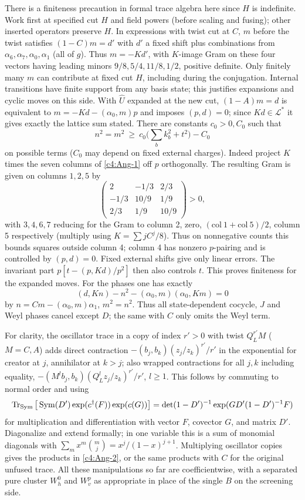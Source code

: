 There is a finiteness precaution in formal trace algebra here since \(H\) is indefinite. Work first at specified cut \(H\) and field powers (before scaling and fusing); other inserted operators preserve \(H\). In expressions with twist cut at \(C\), \(m\) before the twist satisfies \((1-C)m=d'\) with \(d'\) a fixed shift plus combinations from \(\alpha_6,\alpha_7,\alpha_0,\alpha_1\) (all of \(g\)). Thus \(m=-K d'\), with \(K\)-image Gram on these four vectors having leading minors \(9/8,5/4,11/8,1/2\), positive definite. Only finitely many \(m\) can contribute at fixed cut \(H\), including during the conjugation. Internal transitions have finite support from any basis state; this justifies expansions and cyclic moves on this side. With \(\widehat U\) expanded at the new cut, \((1-A)m=d\) is equivalent to \(m=-K d-(\alpha_0,m)p\) and imposes \((p,d)=0\); since \(K d\in\mathcal L^*\) it gives exactly the lattice sum stated. There are constants \(c_0>0,C_0\) such that
\[
 n^2=m^2\ \ge\ c_0\big(\textstyle\sum_b k_b^2+t^2\big)-C_0
\]
on possible terms (\(C_0\) may depend on fixed external charges). Indeed project \(K\) times the seven columns of \eqref{c4:Ang-1} off \(p\) orthogonally. The resulting Gram is given on columns \(1,2,5\) by
\[
 \begin{pmatrix}2&-1/3&2/3\\-1/3&10/9&1/9\\2/3&1/9&10/9\end{pmatrix}>0,
\]
with \(3,4,6,7\) reducing for the Gram to column 2, zero, \((\mathrm{col}\ 1+\mathrm{col}\ 5)/2\), column 5 respectively (multiply using \(K=\sum j C^j/8\)). Thus on nonnegative counts this bounds squares outside column 4; column 4 has nonzero \(p\)-pairing and is controlled by \((p,d)=0\). Fixed external shifts give only linear errors. The invariant part \(p[t-(p,Kd)/p^2]\) then also controls \(t\). This proves finiteness for the expanded moves. For the phases one has exactly
\[
 (d,K n)-n^2-(\alpha_0,m)(\alpha_0,K m)=0
\]
by \(n=Cm-(\alpha_0,m)\alpha_1\), \(m^2=n^2\). Thus all state-dependent cocycle, \(J\) and Weyl phases cancel except \(D\); the same with \(C\) only omits the Weyl term.

For clarity, the oscillator trace in a copy of index \(r'>0\) with twist \(Q_L^{r'} M\) (\(M=C,A\)) adds direct contraction
\(- (b_j,b_k)(z_j/z_k)^{r'}/r'\) in the exponential for creator at \(j\), annihilator at \(k>j\); also wrapped contractions for all \(j,k\) including equality,
\(- (M^l b_j,b_k)(Q_L^l z_j/z_k)^{r'}/r'\), \(l\ge1\). This follows by commuting to normal order and using
\[
 \operatorname{Tr}_{\rm Sym}\big[\operatorname{Sym}(D')\exp(c^\dagger(F))\exp(c(G))\big]
 =\det(1-D')^{-1}\exp(G D'(1-D')^{-1}F)
\]
for multiplication and differentiation with vector \(F\), covector \(G\), and matrix \(D'\). Diagonalize and extend formally; in one variable this is a sum of monomial diagonals with \(\sum_m x^m\binom{m}{j}=x^j/(1-x)^{j+1}\). Multiplying oscillator copies gives the products in \eqref{c4:Ang-2}, or the same products with \(C\) for the original unfused trace. All these manipulations so far are coefficientwise, with a separated pure cluster \(W_h^0\) and \(W_v^p\) as appropriate in place of the single \(B\) on the screening side.

